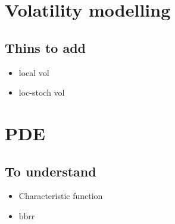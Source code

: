 \documentclass{report}
\begin{document}
\part{Volatility modelling}

\chapter{Thins to add}
\begin{itemize}
	\item local vol
	\item loc-stoch vol
\end{itemize}

\part{PDE}

\chapter{To understand}
\begin{itemize}
	\item Characteristic function
	\item bbrr
\end{itemize}
\end{document}
